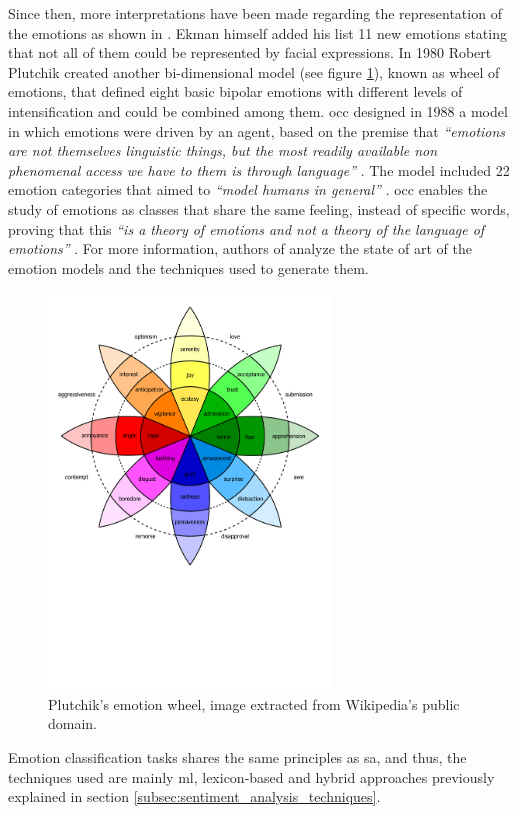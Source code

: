 Since then, more interpretations have been made regarding the representation of the emotions as shown in \cite{cambria2012hourglass}. Ekman himself added his list 11 new emotions stating that not all of them could be represented by facial expressions. In 1980 Robert Plutchik created another bi-dimensional model (see figure \ref{fig:plutchik-wheeel}), known as wheel of emotions, that defined eight basic bipolar emotions with different levels of intensification and could be combined among them. \acrfull{occ} designed in 1988 a model in which emotions were driven by an agent, based on the premise that \textit{``emotions are not themselves linguistic things, but the most readily available non phenomenal access we have to them is through language''} \cite{binali2010computational}. The model included 22 emotion categories that aimed to \textit{``model humans in general''} \cite{binali2010computational}. \acrshort{occ} enables the study of emotions as classes that share the same feeling, instead of specific words, proving that this \textit{``is a theory of emotions and not a theory of the language of emotions''} \cite{binali2010computational}. For more information, authors of \cite{binali2012emotion} analyze the state of art of the emotion models and the techniques used to generate them.

\begin{figure}[!htp]
  \center
  \includegraphics[width=0.67\textwidth]{figures/plutchik-wheel}
  \caption{Plutchik's emotion wheel, image extracted from Wikipedia's public domain.}
  \label{fig:plutchik-wheeel}
\end{figure}

Emotion classification tasks shares the same principles as \acrshort{sa}, and thus, the techniques used are mainly \acrshort{ml}, lexicon-based and hybrid approaches previously explained in section \ref{subsec:sentiment_analysis_techniques}.